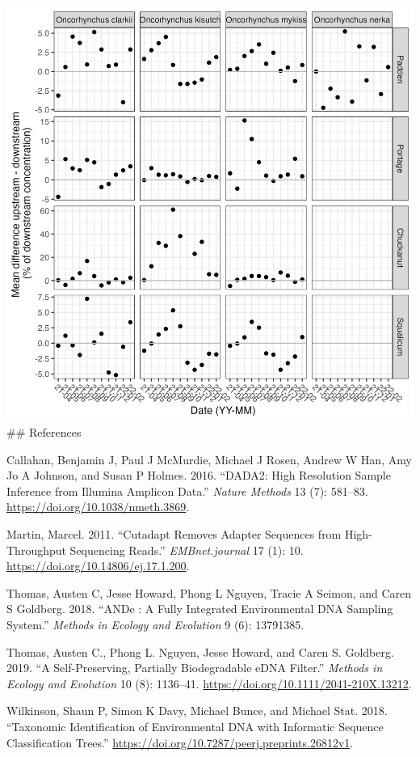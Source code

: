 \documentclass[
]{article}
\newlength{\cslhangindent}
\newlength{\cslentryspacingunit} %
\newenvironment{CSLReferences}[2] %
 {%
  \setlength{\parindent}{0pt}
  \ifodd #1
  \let\oldpar\par
  \def\par{\hangindent=\cslhangindent\oldpar}
  \fi
  \setlength{\parskip}{#2\cslentryspacingunit}
 }%
 {}
\begin{document}
\includegraphics{../Output/SupplementalFigures/20221129_culvert_effect_creek_species_flowcorrected.png}
\#\# References

\hypertarget{refs}{}
\begin{CSLReferences}{1}{0}
\leavevmode{}%
Callahan, Benjamin J, Paul J McMurdie, Michael J Rosen, Andrew W Han,
Amy Jo A Johnson, and Susan P Holmes. 2016. {``DADA2: High Resolution
Sample Inference from Illumina Amplicon Data.''} \emph{Nature Methods}
13 (7): 581--83. \url{https://doi.org/10.1038/nmeth.3869}.

\leavevmode{}%
Martin, Marcel. 2011. {``Cutadapt Removes Adapter Sequences from
High-Throughput Sequencing Reads.''} \emph{EMBnet.journal} 17 (1): 10.
\url{https://doi.org/10.14806/ej.17.1.200}.

\leavevmode{}%
Thomas, Austen C, Jesse Howard, Phong L Nguyen, Tracie A Seimon, and
Caren S Goldberg. 2018. {``ANDe {\texttrademark}: A Fully Integrated
Environmental DNA Sampling System.''} \emph{Methods in Ecology and
Evolution} 9 (6): 13791385.

\leavevmode{}%
Thomas, Austen C., Phong L. Nguyen, Jesse Howard, and Caren S. Goldberg.
2019. {``A Self-Preserving, Partially Biodegradable eDNA Filter.''}
\emph{Methods in Ecology and Evolution} 10 (8): 1136--41.
\url{https://doi.org/10.1111/2041-210X.13212}.

\leavevmode{}%
Wilkinson, Shaun P, Simon K Davy, Michael Bunce, and Michael Stat. 2018.
{``Taxonomic Identification of Environmental DNA with Informatic
Sequence Classification Trees.''}
\url{https://doi.org/10.7287/peerj.preprints.26812v1}.

\end{CSLReferences}
\end{document}
